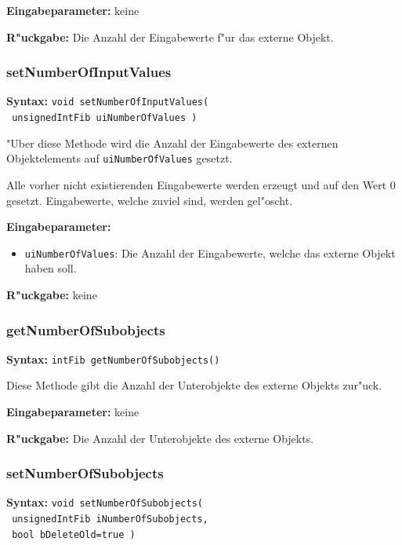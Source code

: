 \bigskip\noindent
\textbf{Eingabeparameter:} keine

\bigskip\noindent
\textbf{R"uckgabe:} Die Anzahl der Eingabewerte f"ur das externe Objekt.


\subsubsection{setNumberOfInputValues}

\textbf{Syntax:} \verb|void setNumberOfInputValues(| \\\verb| unsignedIntFib uiNumberOfValues )|

\bigskip\noindent
"Uber diese Methode wird die Anzahl der Eingabewerte des externen Objektelements auf \verb|uiNumberOfValues| gesetzt.

Alle vorher nicht existierenden Eingabewerte werden erzeugt und auf den Wert $0$ gesetzt. Eingabewerte, welche zuviel sind, werden gel"oscht.

\bigskip\noindent
\textbf{Eingabeparameter:}
\begin{itemize}
 \item \verb|uiNumberOfValues|: Die Anzahl der Eingabewerte, welche das externe Objekt haben soll.
\end{itemize}

\bigskip\noindent
\textbf{R"uckgabe:} keine


\subsubsection{getNumberOfSubobjects}

\textbf{Syntax:} \verb|intFib getNumberOfSubobjects()|

\bigskip\noindent
Diese Methode gibt die Anzahl der Unterobjekte des externe Objekts zur"uck.

\bigskip\noindent
\textbf{Eingabeparameter:} keine

\bigskip\noindent
\textbf{R"uckgabe:} Die Anzahl der Unterobjekte des externe Objekts.


\subsubsection{setNumberOfSubobjects}

\textbf{Syntax:} \verb|void setNumberOfSubobjects(| \\\verb| unsignedIntFib iNumberOfSubobjects,| \\\verb| bool bDeleteOld=true )|

